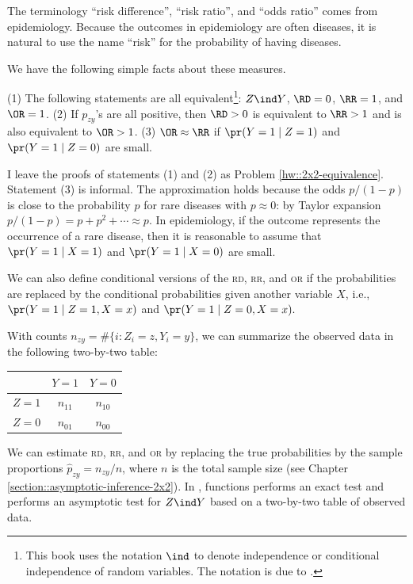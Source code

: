 The terminology ``risk difference'', ``risk ratio'', and ``odds ratio'' comes from epidemiology. Because the outcomes in epidemiology are often diseases, it is natural to use the name ``risk'' for the probability of having diseases. 
 
 
We have the following simple facts about these measures.
\begin{proposition}\label{prop::2x2-independence}
(1) The following statements are all equivalent\footnote{This book uses the notation $\ind$ to denote independence or conditional independence of random variables. The notation is due to \citet{dawid1979conditional}.}: $Z\ind Y $, $\RD = 0$, $\RR = 1$, and $\OR = 1$. 
(2) If $p_{zy}$'s are all positive, then $\RD >0$ is equivalent to $\RR >1$ and is also equivalent to $\OR > 1$. 
(3)
$\OR \approx \RR$ if  $\pr(Y=1\mid Z=1)$ and $ \pr(Y=1\mid Z=0)$ are small. 
\end{proposition}

I leave the proofs of statements (1) and (2) as Problem \ref{hw::2x2-equivalence}. Statement (3) is informal. The approximation holds because the odds $p/(1-p)$ is close to the probability $p$ for rare diseases with $p\approx 0$: by Taylor expansion $p/(1-p) = p + p^2 + \cdots\approx p $. In epidemiology, if the outcome represents the occurrence of a rare disease, then it is reasonable to assume that $\pr(Y=1\mid X=1)$ and $ \pr(Y=1\mid X=0)$ are small. 
 

 
We can also define conditional versions of the \textsc{rd}, \textsc{rr}, and \textsc{or}  if the probabilities are replaced by the conditional probabilities given another variable $X$, i.e., $\pr(Y=1\mid Z=1, X=x) $ and $ \pr(Y=1\mid Z=0, X=x)  .$
 
 
With counts $n_{zy} = \#\{i:  Z_i=z, Y_i=y \}$, we can summarize the observed data in the following two-by-two table:
 \begin{center}
\begin{tabular}{lcc}
\hline 
        & $Y =1$ & $Y =0$\\\hline
$Z =1$ & $n_{11}$ & $n_{10}$\\ 
$Z =0$ & $n_{01}$ & $n_{00}$\\ 
\hline 
\end{tabular}
\end{center}
We can estimate  \textsc{rd}, \textsc{rr}, and \textsc{or}  by replacing the true probabilities by the sample proportions $\hat p_{zy} = n_{zy}  / n$, where $n$ is the total sample size (see Chapter \ref{section::asymptotic-inference-2x2}). In , functions  performs an exact test and  performs an asymptotic test for   $Z \ind Y$ based on a two-by-two table of observed data. 
 
